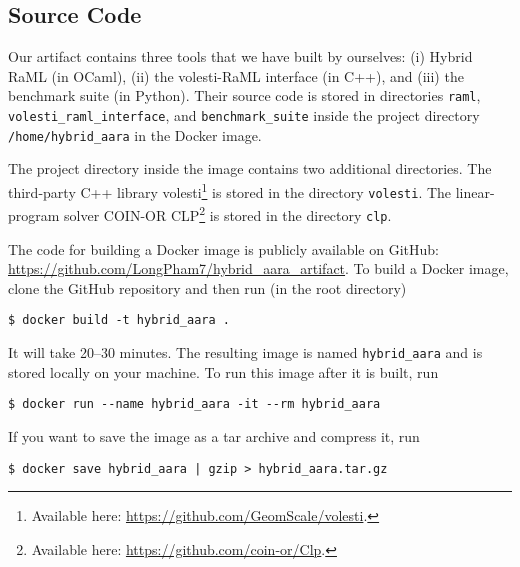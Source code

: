 \subsection{Source Code}

Our artifact contains three tools that we have built by ourselves: (i) Hybrid
RaML (in OCaml), (ii) the volesti-RaML interface (in C++), and (iii) the
benchmark suite (in Python).
%
Their source code is stored in directories \texttt{raml},
\texttt{volesti\_raml\_interface}, and \texttt{benchmark\_suite} inside the
project directory \texttt{/home/hybrid\_aara} in the Docker image.

The project directory inside the image contains two additional directories.
%
The third-party C++ library volesti\footnote{Available here:
\url{https://github.com/GeomScale/volesti}.} is stored in the directory
\texttt{volesti}.
%
The linear-program solver COIN-OR CLP\footnote{Available here:
\url{https://github.com/coin-or/Clp}.} is stored in the directory \texttt{clp}.

The code for building a Docker image is publicly available on GitHub:
\url{https://github.com/LongPham7/hybrid_aara_artifact}.
%
To build a Docker image, clone the GitHub repository and then run (in the root
directory)
\begin{verbatim}
$ docker build -t hybrid_aara .
\end{verbatim}
%
It will take 20--30 minutes.
%
The resulting image is named \texttt{hybrid\_aara} and is stored locally on your
machine.
%
To run this image after it is built, run
\begin{verbatim}
$ docker run --name hybrid_aara -it --rm hybrid_aara
\end{verbatim}
%
If you want to save the image as a tar archive and compress it, run
\begin{verbatim}
$ docker save hybrid_aara | gzip > hybrid_aara.tar.gz
\end{verbatim}

